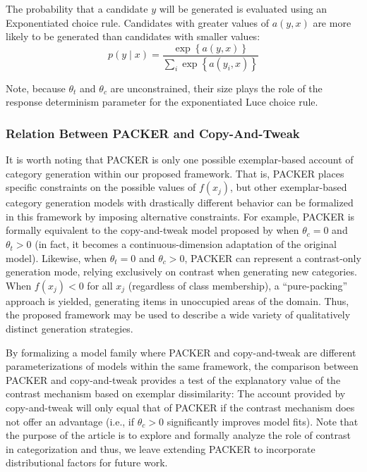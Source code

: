 \documentclass[pdflatex,sn-apa]{sn-jnl}%
\theoremstyle{thmstyleone}%
\theoremstyle{thmstyletwo}%
\theoremstyle{thmstylethree}%
\begin{document}
The probability that a candidate $y$ will be generated is evaluated using an
Exponentiated \citet{luce1977choice} choice rule. Candidates with greater values
of $a(y,x)$ are more likely to be generated than candidates with smaller values:
% 
\begin{equation} p(y \mid x) = \dfrac { \exp \left \{ a \left( y, x
\right) \right \} } { \sum_i{ \exp \left \{ a \left( y_i, x \right)
\right\} } }
\label{eq:packer-choice}
\end{equation}

Note, because $\theta_t$ and $\theta_c$ are unconstrained, their size plays the
role of the response determinism parameter for the exponentiated Luce choice
rule.

\subsubsection{Relation Between PACKER and Copy-And-Tweak}
\label{section:copytweak-packer}

It is worth noting that PACKER is only one possible exemplar-based account of
category generation within our proposed framework. That is, PACKER places
specific constraints on the possible values of $f(x_j)$, but other
exemplar-based category generation models with drastically different behavior
can be formalized in this framework by imposing alternative constraints. For
example, PACKER is formally equivalent to the copy-and-tweak model proposed by
\cite{jern2013probabilistic} when $\theta_c = 0$ and $\theta_t > 0$ (in fact, it
becomes a continuous-dimension adaptation of the original model). Likewise,
when $\theta_t = 0$ and $\theta_c > 0$, PACKER can represent a contrast-only
generation mode, relying exclusively on contrast when generating new categories.
When $f(x_j) < 0$ for all $x_j$ (regardless of class membership), a
``pure-packing'' approach is yielded, generating items in unoccupied areas of
the domain. Thus, the proposed framework may be used to describe a wide variety
of qualitatively distinct generation strategies.

By formalizing a model family where PACKER and copy-and-tweak are different
parameterizations of models within the same framework, the comparison between
PACKER and copy-and-tweak provides a test of the explanatory value of the
contrast mechanism based on exemplar dissimilarity: The account provided by
copy-and-tweak will only equal that of PACKER if the contrast mechanism does not
offer an advantage (i.e., if $\theta_c > 0$ significantly improves model fits).
Note that the purpose of the article is to explore and formally analyze the role
of contrast in categorization and thus, we leave extending PACKER to incorporate
distributional factors for future work.
\end{document}
